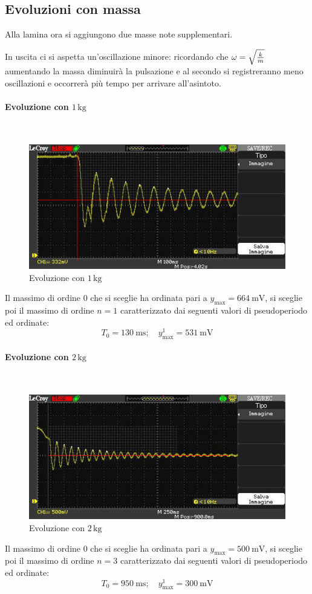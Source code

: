 \documentclass[a4paper, 12pt, twoside]{report}
\begin{document}
\newpage
	 	
	 	\subsection{Evoluzioni con massa}
	 	Alla lamina ora si aggiungono due masse note supplementari. \newline
	 	
	 	In uscita ci si aspetta un'oscillazione minore: ricordando che $\omega=\sqrt{k\over m}$ aumentando la massa diminuirà la pulsazione e al secondo si registreranno meno oscillazioni e occorrerà più tempo per arrivare all'asintoto.
	 	
	 	\paragraph{Evoluzione con $1\,\text{kg}$} \mbox{} \\ 
	 	\begin{figure}[H]
	 		\centering
	 		\includegraphics[width=0.7\linewidth]{immaginioscillo/9+}
	 		\caption{Evoluzione con $1\,\text{kg}$}
	 		\label{fig:14}
	 	\end{figure}
 	
	 	Il massimo di ordine 0 che si sceglie ha ordinata pari a $y_{\max}=\SI{664}{\milli\volt}$, si sceglie poi il massimo di ordine $n=1$ caratterizzato dai seguenti valori di pseudoperiodo ed ordinate:
	 	\[T_0=\SI{130}{\milli\second};\quad  y^1_{\max}=\SI{531}{\milli\volt}\]

\newpage
	 	
	 	\paragraph{Evoluzione con $2\,\text{kg}$} \mbox{} \\ 
	 	\begin{figure}[H]
	 		\centering
	 		\includegraphics[width=0.7\linewidth]{immaginioscillo/10+}
	 		\caption{Evoluzione con $2\,\text{kg}$}
	 		\label{fig:15}
	 	\end{figure}
	 	Il massimo di ordine 0 che si sceglie ha ordinata pari a $y_{\max}=\SI{500}{\milli\volt}$, si sceglie poi il massimo di ordine $n=3$ caratterizzato dai seguenti valori di pseudoperiodo ed ordinate: 
	 	\[T_0=\SI{950}{\milli\second};\quad  y^1_{\max}=\SI{300}{\milli\volt}\]
	 	
\end{document}
